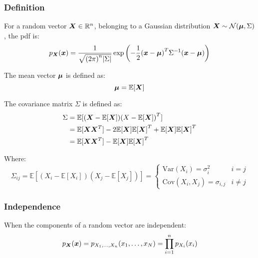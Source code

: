 \documentclass[../../main.tex]{subfiles}
\begin{document}
\subsubsection{Definition}

For a random vector $\bm{X} \in \mathbb{R}^n$, belonging to a Gaussian distribution $\bm{X} \sim \mathcal{N}(\bm{\mu}, \Sigma)$, the pdf is:
\[
p_{\bm{X}}(\bm{x}) =
\frac{1}{\sqrt{{\left(2\pi\right)}^n{\left|\Sigma \right|}}}
\exp{\left(-\frac{1}{2}{( \bm{x} - \bm{\mu} )}^T\Sigma^{-1}( \bm{x} - \bm{\mu} )\right)}
\]

The mean vector $\bm{\mu}$ is defined as:
\[ \bm{\mu} = \mathbb{E}[\bm{X}] \]

The covariance matrix $\Sigma$ is defined as:
\begin{align*}
\Sigma
&= \mathbb{E}[(\bm{X} - \mathbb{E}[\bm{X}]){(X - \mathbb{E}[\bm{X}])}^T] \\
&= \mathbb{E}[\bm{X}\bm{X}^T] - 2\mathbb{E}[\bm{X}]{\mathbb{E}[ \bm{X} ]}^T + \mathbb{E}[\bm{X}]{\mathbb{E}[ \bm{X} ]}^T \\
&= \mathbb{E}[\bm{X}\bm{X}^T] - \mathbb{E}[\bm{X}]{\mathbb{E}[ \bm{X} ]}^T
\end{align*}

Where: \[
\Sigma_{ij} = \mathbb{E}[(X_i - \mathbb{E}[X_i])(X_j - \mathbb{E}[X_j])] =
\begin{cases}
    \textrm{Var}(X_i) = \sigma_i^2 & i = j \\
    \textrm{Cov}(X_i, X_j) = \sigma_{i,j} & i \neq j
\end{cases}
\]

\subsubsection{Independence}

When the components of a random vector are independent:
\[ p_{\bm{X}}(\bm{x}) = p_{X_1, \ldots, X_n}(x_1, \ldots, x_N) = \prod_{i=1}^n p_{X_i}(x_i) \]
\end{document}
